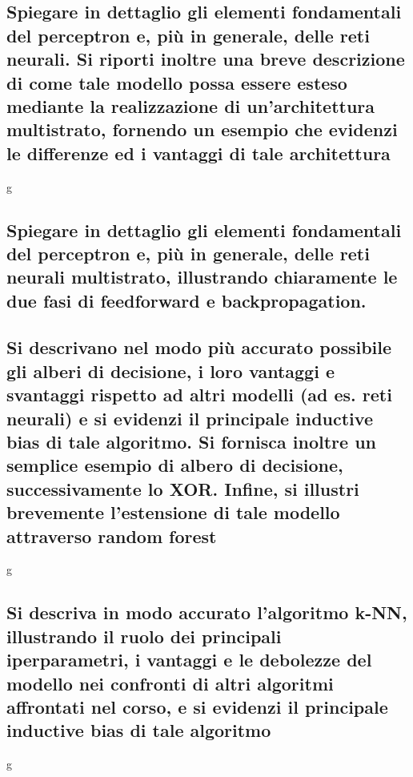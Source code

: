 \documentclass[10pt,oneside,a4paper]{article}
\begin{document}
	\subsection{Spiegare in dettaglio gli elementi fondamentali del perceptron e, più in generale, delle reti
		neurali. Si riporti inoltre una breve descrizione di come tale modello possa essere esteso
		mediante la realizzazione di un’architettura multistrato, fornendo un esempio che evidenzi
		le differenze ed i vantaggi di tale architettura}
	g
	
	\subsection{Spiegare in dettaglio gli elementi fondamentali del perceptron e, più in generale, delle reti
		neurali multistrato, illustrando chiaramente le due fasi di feedforward e backpropagation.}
	
	
	
	\subsection{Si descrivano nel modo più accurato possibile gli alberi di decisione, i loro vantaggi e svantaggi rispetto ad altri modelli (ad es. reti neurali)
		 e si evidenzi il principale inductive bias di tale algoritmo. Si fornisca inoltre un semplice esempio di albero di decisione, successivamente lo XOR. Infine, si illustri brevemente l’estensione di tale modello attraverso random forest}
	g
	
	
	\subsection{Si descriva in modo accurato l’algoritmo k-NN, illustrando il ruolo dei principali iperparametri, i vantaggi e le debolezze del modello nei 
		confronti di altri algoritmi affrontati nel corso, e si evidenzi il principale inductive bias di tale algoritmo}
	g
	
	
	
\end{document}
